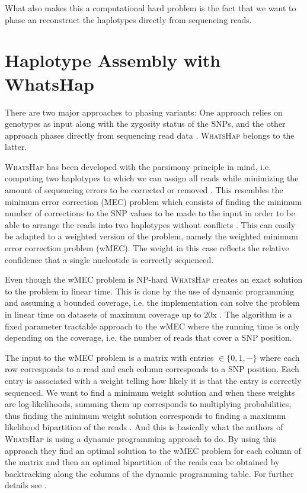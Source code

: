\documentclass[10pt,a4paper]{article}
\begin{document}
What also makes this a computational hard problem is the fact that we want to phase an reconstruct the haplotypes directly from sequencing reads. 

\section{Haplotype Assembly with WhatsHap}
There are two major approaches to phasing variants: One approach relies on genotypes as input along with the zygosity status of the SNPs, and the other approach phases directly from sequencing read data \cite{whatshap}. \textsc{WhatsHap} belongs to the latter. 

\textsc{WhatsHap} has been developed with the parsimony principle in mind, i.e. computing two haplotypes to which we can assign all reads while minimizing the amount of sequencing errors to be corrected or removed \cite{whatshap}. This resembles the minimum error correction (MEC) problem which consists of finding the minimum number of corrections to the SNP values to be made to the input in order to be able to arrange the reads into two haplotypes without conflicts \cite{whatshap}. This can easily be adapted to a weighted version of the problem, namely the weighted minimum error correction problem (wMEC). The weight in this case reflects the relative confidence that a single nucleotide is correctly sequenced.

Even though the wMEC problem is NP-hard \textsc{WhatsHap} creates an exact solution to the problem in linear time. This is done by the use of dynamic programming and assuming a bounded coverage, i.e. the implementation can solve the problem in linear time on datasets of maximum coverage up to 20x \cite{whatshap}. The algorithm is a fixed parameter tractable approach to the wMEC where the running time is only depending on the coverage, i.e. the number of reads that cover a SNP position.

The input to the wMEC problem is a matrix with entries $\in\{0, 1, -\}$ where each row corresponds to a read and each column corresponds to a SNP position. Each entry is associated with a weight telling how likely it is that the entry is correctly sequenced. We want to find a minimum weight solution and when these weights are log-likelihoods, summing them up corresponds to multiplying probabilities, thus finding the minimum weight solution corresponds to finding a maximum likelihood bipartition of the reads \cite{whatshap}. And this is basically what the authors of \textsc{WhatsHap} is using a dynamic programming approach to do. By using this approach they find an optimal solution to the wMEC problem for each column of the matrix and then an optimal bipartition of the reads can be obtained by backtracking along the columns of the dynamic programming table. For further details see \cite{whatshap}.
\end{document}
